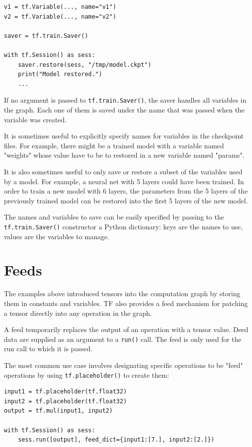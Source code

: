 \begin{lstlisting}
v1 = tf.Variable(..., name="v1")
v2 = tf.Variable(..., name="v2")

saver = tf.train.Saver()

with tf.Session() as sess:
    saver.restore(sess, "/tmp/model.ckpt")
    print("Model restored.")
    ...
\end{lstlisting}

If no argument is passed to \lstinline|tf.train.Saver()|, the saver handles all variables in the graph. Each one of them is saved under the name that was passed when the variable was created.

It is sometimes useful to explicitly specify names for variables in the checkpoint files. For example, there might be a trained model with a variable named "weights" whose value have to be to restored in a new variable named "params".

It is also sometimes useful to only save or restore a subset of the variables used by a model. For example, a neural net with 5 layers could have been trained. In order to train a new model with 6 layers, the parameters from the 5 layers of the previously trained model can be restored into the first 5 layers of the new model.

The names and variables to save can be easily specified by passing to the \lstinline|tf.train.Saver()| constructor a Python dictionary: keys are the names to use, values are the variables to manage.

\section{Feeds}

The examples above introduced tensors into the computation graph by storing them in constants and variables. \acs{TF} also provides a feed mechanism for patching a tensor directly into any operation in the graph.

A feed temporarily replaces the output of an operation with a tensor value. Deed data are supplied as an argument to a \lstinline|run()| call. The feed is only used for the run call to which it is passed.

The most common use case involves designating specific operations to be "feed" operations by using \lstinline|tf.placeholder()| to create them:

\begin{lstlisting}
input1 = tf.placeholder(tf.float32)
input2 = tf.placeholder(tf.float32)
output = tf.mul(input1, input2)

with tf.Session() as sess:
    sess.run([output], feed_dict={input1:[7.], input2:[2.]})
\end{lstlisting}


